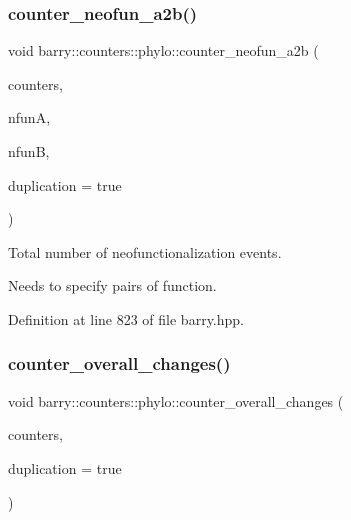 \subsubsection{\texorpdfstring{counter\+\_\+neofun\+\_\+a2b()}{counter\_neofun\_a2b()}}
{\footnotesize\ttfamily void barry\+::counters\+::phylo\+::counter\+\_\+neofun\+\_\+a2b (\begin{DoxyParamCaption}\item[{\hyperlink{namespacebarry_1_1counters_1_1phylo_a4e401ffe66d04091343dcffaf915f8c3}{Phylo\+Counters} $\ast$}]{counters,  }\item[{\hyperlink{namespacebarry_a11dfc53ddb4672278319aa04f1e09a6c}{uint}}]{nfunA,  }\item[{\hyperlink{namespacebarry_a11dfc53ddb4672278319aa04f1e09a6c}{uint}}]{nfunB,  }\item[{bool}]{duplication = {\ttfamily true} }\end{DoxyParamCaption})\hspace{0.3cm}{\ttfamily [inline]}}



Total number of neofunctionalization events. 

Needs to specify pairs of function. 

Definition at line 823 of file barry.\+hpp.

\mbox{\label{namespacebarry_1_1counters_1_1phylo_abeaaaa150b98e55f7bc242810fa1230a}} 
\subsubsection{\texorpdfstring{counter\+\_\+overall\+\_\+changes()}{counter\_overall\_changes()}}
{\footnotesize\ttfamily void barry\+::counters\+::phylo\+::counter\+\_\+overall\+\_\+changes (\begin{DoxyParamCaption}\item[{\hyperlink{namespacebarry_1_1counters_1_1phylo_a4e401ffe66d04091343dcffaf915f8c3}{Phylo\+Counters} $\ast$}]{counters,  }\item[{bool}]{duplication = {\ttfamily true} }\end{DoxyParamCaption})\hspace{0.3cm}{\ttfamily [inline]}}



